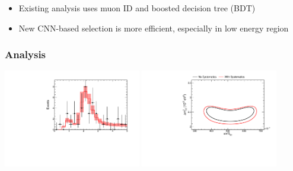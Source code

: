 \documentclass[10pt,professionalfonts,xcolor=table]{beamer}
\begin{document}
\begin{frame}
\begin{columns}
\end{columns}
\gap
  \begin{itemize}
  \item Existing \nova analysis uses muon ID and boosted decision tree (BDT)
  \gap
  \item New CNN-based selection is more efficient, especially in low energy region
  \end{itemize}
\end{frame}

\begin{frame}
\end{frame}


\begin{frame}
\frametitle{Analysis}
\begin{center}
\vspace{-10pt}
\includegraphics[angle=-90, width=0.45\textwidth]{figures/systs/prediction/fd_extrap_prediction_full_syst_mock_data.pdf}
\includegraphics[angle=-90, width=0.45\textwidth]{figures/systs/prediction/fd_extrap_contour_full_syst.pdf}
\end{center}


\begin{itemize}


\end{itemize}
\end{frame}
\end{document}
